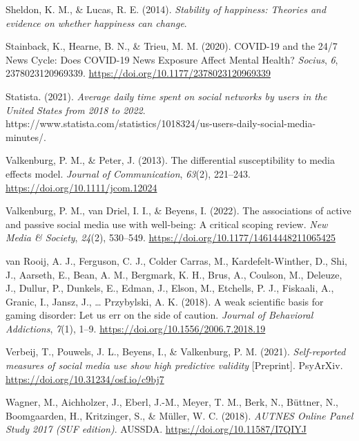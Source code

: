 \documentclass[
  man,mask]{apa7}
\newlength{\cslhangindent}
\newlength{\cslentryspacingunit} %
\newenvironment{CSLReferences}[2] %
 {%
  \setlength{\parindent}{0pt}
  \ifodd #1
  \let\oldpar\par
  \def\par{\hangindent=\cslhangindent\oldpar}
  \fi
  \setlength{\parskip}{#2\cslentryspacingunit}
 }%
 {}
\begin{document}
\begin{CSLReferences}{1}{0}
\leavevmode{}%
Sheldon, K. M., \& Lucas, R. E. (2014). \emph{Stability of happiness: Theories and evidence on whether happiness can change}.

\leavevmode{}%
Stainback, K., Hearne, B. N., \& Trieu, M. M. (2020). {COVID-19} and the 24/7 {News Cycle}: {Does COVID-19 News Exposure Affect Mental Health}? \emph{Socius}, \emph{6}, 2378023120969339. \url{https://doi.org/10.1177/2378023120969339}

\leavevmode{}%
Statista. (2021). \emph{Average daily time spent on social networks by users in the {United States} from 2018 to 2022}. https://www.statista.com/statistics/1018324/us-users-daily-social-media-minutes/.

\leavevmode{}%
Valkenburg, P. M., \& Peter, J. (2013). The differential susceptibility to media effects model. \emph{Journal of Communication}, \emph{63}(2), 221--243. \url{https://doi.org/10.1111/jcom.12024}

\leavevmode{}%
Valkenburg, P. M., van Driel, I. I., \& Beyens, I. (2022). The associations of active and passive social media use with well-being: {A} critical scoping review. \emph{New Media \& Society}, \emph{24}(2), 530--549. \url{https://doi.org/10.1177/14614448211065425}

\leavevmode{}%
van Rooij, A. J., Ferguson, C. J., Colder Carras, M., Kardefelt-Winther, D., Shi, J., Aarseth, E., Bean, A. M., Bergmark, K. H., Brus, A., Coulson, M., Deleuze, J., Dullur, P., Dunkels, E., Edman, J., Elson, M., Etchells, P. J., Fiskaali, A., Granic, I., Jansz, J., \ldots{} Przybylski, A. K. (2018). A weak scientific basis for gaming disorder: {Let} us err on the side of caution. \emph{Journal of Behavioral Addictions}, \emph{7}(1), 1--9. \url{https://doi.org/10.1556/2006.7.2018.19}

\leavevmode{}%
Verbeij, T., Pouwels, J. L., Beyens, I., \& Valkenburg, P. M. (2021). \emph{Self-reported measures of social media use show high predictive validity} {[}Preprint{]}. {PsyArXiv}. \url{https://doi.org/10.31234/osf.io/c9bj7}

\leavevmode{}%
Wagner, M., Aichholzer, J., Eberl, J.-M., Meyer, T. M., Berk, N., Büttner, N., Boomgaarden, H., Kritzinger, S., \& Müller, W. C. (2018). \emph{{AUTNES Online Panel Study} 2017 ({SUF} edition)}. {AUSSDA}. \url{https://doi.org/10.11587/I7QIYJ}


\end{CSLReferences}
\end{document}
